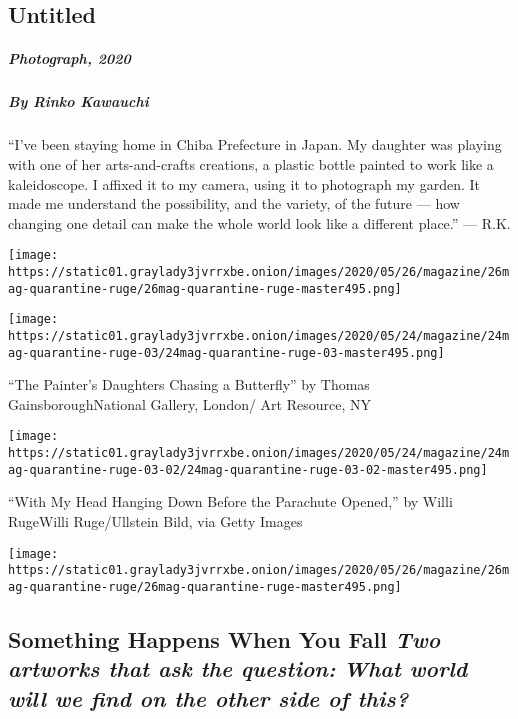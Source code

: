 \hypertarget{untitled-1}{%
\subsection{Untitled}\label{untitled-1}}

\hypertarget{photograph-2020-3}{%
\subparagraph{Photograph, 2020}\label{photograph-2020-3}}

\hypertarget{by-rinko-kawauchi-1}{%
\subparagraph{By Rinko Kawauchi}\label{by-rinko-kawauchi-1}}

``I've been staying home in Chiba Prefecture in Japan. My daughter was
playing with one of her arts-and-crafts creations, a plastic bottle
painted to work like a kaleidoscope. I affixed it to my camera, using it
to photograph my garden. It made me understand the possibility, and the
variety, of the future --- how changing one detail can make the whole
world look like a different place.'' --- R.K.

\texttt{[image: https://static01.graylady3jvrrxbe.onion/images/2020/05/26/magazine/26mag-quarantine-ruge/26mag-quarantine-ruge-master495.png]}

\texttt{[image: https://static01.graylady3jvrrxbe.onion/images/2020/05/24/magazine/24mag-quarantine-ruge-03/24mag-quarantine-ruge-03-master495.png]}

``The Painter's Daughters Chasing a Butterfly'' by Thomas
GainsboroughNational Gallery, London/ Art Resource, NY

\texttt{[image: https://static01.graylady3jvrrxbe.onion/images/2020/05/24/magazine/24mag-quarantine-ruge-03-02/24mag-quarantine-ruge-03-02-master495.png]}

``With My Head Hanging Down Before the Parachute Opened,'' by Willi
RugeWilli Ruge/Ullstein Bild, via Getty Images

\texttt{[image: https://static01.graylady3jvrrxbe.onion/images/2020/05/26/magazine/26mag-quarantine-ruge/26mag-quarantine-ruge-master495.png]}

\hypertarget{something-happens-when-you-fall-two-artworks-that-ask-the-question-what-world-will-we-find-on-the-other-side-of-this}{%
\subsection{\texorpdfstring{Something Happens When You Fall \emph{Two
artworks that ask the question:} \emph{What world will we find on the
other side of
this?}}{Something Happens When You Fall Two artworks that ask the question: What world will we find on the other side of this?}}\label{something-happens-when-you-fall-two-artworks-that-ask-the-question-what-world-will-we-find-on-the-other-side-of-this}}

